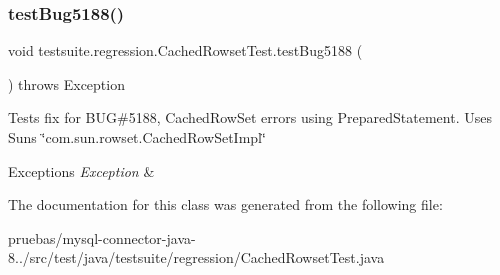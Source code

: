 \subsubsection{\texorpdfstring{test\+Bug5188()}{testBug5188()}}
{\footnotesize\ttfamily void testsuite.\+regression.\+Cached\+Rowset\+Test.\+test\+Bug5188 (\begin{DoxyParamCaption}{ }\end{DoxyParamCaption}) throws Exception}

Tests fix for B\+UG\#5188, Cached\+Row\+Set errors using Prepared\+Statement. Uses Sun\textquotesingle{}s \char`\"{}com.\+sun.\+rowset.\+Cached\+Row\+Set\+Impl\char`\"{}


\begin{DoxyExceptions}{Exceptions}
{\em Exception} & \\
\hline
\end{DoxyExceptions}


The documentation for this class was generated from the following file\+:\begin{DoxyCompactItemize}
\item 
pruebas/mysql-\/connector-\/java-\/8../src/test/java/testsuite/regression/Cached\+Rowset\+Test.\+java\end{DoxyCompactItemize}
